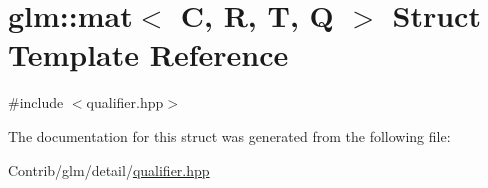 \hypertarget{structglm_1_1mat}{}\section{glm\+:\+:mat$<$ C, R, T, Q $>$ Struct Template Reference}
\label{structglm_1_1mat}


{\ttfamily \#include $<$qualifier.\+hpp$>$}



The documentation for this struct was generated from the following file\+:\begin{DoxyCompactItemize}
\item 
Contrib/glm/detail/\mbox{\hyperlink{qualifier_8hpp}{qualifier.\+hpp}}\end{DoxyCompactItemize}
